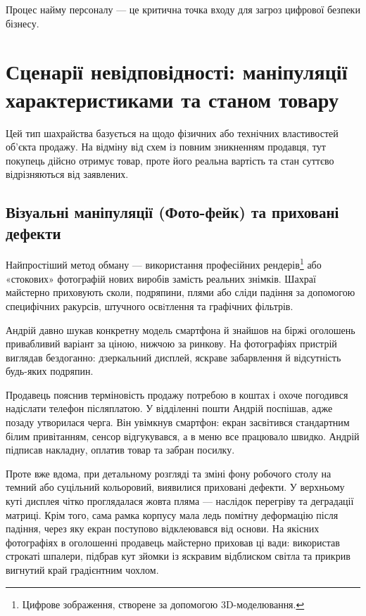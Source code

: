  Процес найму персоналу — це критична точка входу для загроз цифрової безпеки бізнесу. 

\newpage 

\chapter{Сценарії невідповідності: маніпуляції характеристиками та станом товару}

Цей тип шахрайства базується на  щодо фізичних або технічних властивостей об’єкта продажу. На відміну від схем із повним зникненням продавця, тут покупець дійсно отримує товар, проте його реальна вартість та стан суттєво відрізняються від заявлених. 

\vspace{0.3cm}
\section{Візуальні маніпуляції (Фото-фейк) та приховані дефекти}

Найпростіший метод обману — використання професійних рендерів\footnote{Цифрове зображення, створене за допомогою 3D-моделювання.} або «стокових» фотографій нових виробів замість реальних знімків. Шахраї майстерно приховують сколи, подряпини, плями або сліди падіння за допомогою специфічних ракурсів, штучного освiтлення та графічних фільтрів.


Андрій давно шукав конкретну модель смартфона й знайшов на біржі оголошень привабливий варіант за ціною, нижчою за ринкову. На фотографіях пристрій виглядав бездоганно: дзеркальний дисплей, яскраве забарвлення й відсутність будь-яких подряпин. 

\newpage 

Продавець пояснив терміновість продажу потребою в коштах і охоче погодився надіслати телефон післяплатою. У відділенні пошти Андрій поспішав, адже позаду утворилася черга. Він увімкнув смартфон: екран засвітився стандартним білим привітанням, сенсор відгукувався, а в меню все працювало швидко. Андрій підписав накладну, оплатив товар та забран посилку. 

Проте вже вдома, при детальному розгляді та зміні фону робочого столу на темний або суцільний кольоровий, виявилися приховані дефекти. У верхньому куті дисплея чітко проглядалася жовта пляма — наслідок перегріву та деградації матриці. Крім того, сама рамка корпусу мала ледь помітну деформацію після падіння, через яку екран поступово відклеювався від основи. На якісних фотографіях в оголошенні продавець майстерно приховав ці вади: використав строкаті шпалери, підбрав кут зйомки із яскравим відблиском світла та прикрив вигнутий край градієнтним чохлом.

